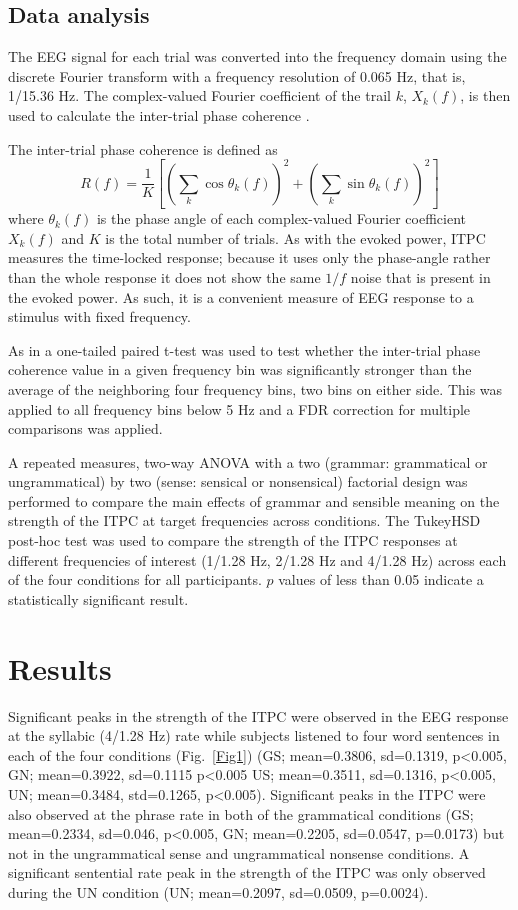 \documentclass[a4paper,10pt,twoside]{article}
\begin{document}
{\subsection*{Data analysis}

The EEG signal for each trial was converted into the frequency
domain using the discrete Fourier transform with a frequency
resolution of 0.065 Hz, that is, 1/15.36 Hz. The complex-valued
Fourier coefficient of the trail $k$, $X_k(f)$, is then used to
calculate the inter-trial phase coherence .

The inter-trial phase coherence is defined as
\begin{equation}
\label{eq:itpc}
R(f)=\frac{1}{K}\left[\left(\sum_k{\cos{\theta_k(f)}}\right)^2+\left(\sum_k{\sin{\theta_k(f)}}\right)^2\right]
\end{equation}
where $\theta_k(f)$ is the phase angle of each complex-valued Fourier
coefficient $X_k(f)$ and $K$ is the total number of trials. As with
the evoked power, ITPC measures the time-locked response; because it
uses only the phase-angle rather than the whole response it does not
show the same $1/f$ noise that is present in the evoked power. As
such, it is a convenient measure of EEG response to a stimulus with
fixed frequency.

As in \cite{DingEtAl2016} a one-tailed paired t-test was used to test
whether the inter-trial phase coherence value in a given frequency bin
was significantly stronger than the average of the neighboring four
frequency bins, two bins on either side. This was applied to all
frequency bins below 5 Hz and a FDR correction for multiple
comparisons was applied.

A repeated measures, two-way ANOVA with a two (grammar: grammatical or
ungrammatical) by two (sense: sensical or nonsensical) factorial
design was performed to compare the main effects of grammar and
sensible meaning on the strength of the ITPC at target frequencies
across conditions. The TukeyHSD post-hoc test was used to compare the
strength of the ITPC responses at different frequencies of interest
(1/1.28 Hz, 2/1.28 Hz and 4/1.28 Hz) across each of the four
conditions for all participants. $p$ values of less than 0.05 indicate
a statistically significant result.


\section*{Results}

Significant peaks in the strength of the ITPC were observed in
the EEG response at the syllabic (4/1.28 Hz) rate while subjects listened to four word sentences in each of the four conditions (Fig.~\ref{Fig1}) (GS; mean=0.3806, sd=0.1319, p<0.005, GN; mean=0.3922, sd=0.1115 p<0.005 US; mean=0.3511, sd=0.1316, p<0.005, UN; mean=0.3484, std=0.1265, p<0.005).
Significant peaks in the ITPC were also observed at the phrase rate in both of the grammatical conditions (GS; mean=0.2334, sd=0.046, p<0.005, GN; mean=0.2205, sd=0.0547, p=0.0173) but not in the ungrammatical sense and ungrammatical nonsense conditions. A significant sentential rate peak in the strength of the ITPC was only observed during the UN condition (UN; mean=0.2097, sd=0.0509, p=0.0024).

}
\end{document}

